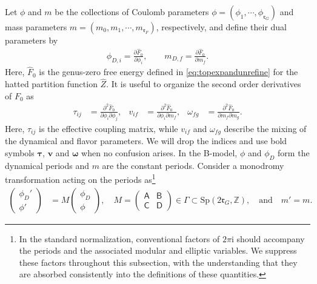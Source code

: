 \documentclass[11pt, a4paper]{article}
\theoremstyle{definition}
\begin{document}
Let $\phi$ and $m$ be the collections of Coulomb parameters $\phi=(\phi_1,\cdots,\phi_{\mathfrak{r}_G})$ and mass parameters $m=(m_0,m_1,\cdots,m_{\mathfrak{r}_F})$, respectively, and define their dual parameters by
\begin{align}
    \phi_{D,i}=\frac{\partial \hat F_0}{\partial\phi_i},
    \qquad
    m_{D,f}=\frac{\partial  \hat F_0}{\partial m_f}.
\end{align}
Here, $ \hat F_0 $ is the genus-zero free energy defined in \eqref{eq:topexpandunrefine} for the hatted partition function $\hat{Z}$. It is useful to organize the second order derivatives of $F_0$ as
\begin{align}\label{eq:tauvw}
    \tau_{ij}
    &=
    \frac{\partial^2\hat F_0}{\partial\phi_i\partial\phi_j},
    &
    v_{if}
    &=
    \frac{\partial^2\hat F_0}{\partial\phi_i\partial m_f},
    &
    \omega_{fg}
    &=
    \frac{\partial^2\hat F_0}{\partial m_f\partial m_g}.
\end{align}
Here, $\tau_{ij}$ is the effective coupling matrix, while $v_{if}$ and $\omega_{fg}$ describe the mixing of the dynamical and flavor parameters. We will drop the indices and use bold symbols $\boldsymbol{\tau}$, $\boldsymbol v$ and $\boldsymbol\omega$ when no confusion arises. In the B-model, $\phi$ and $\phi_D$ form the dynamical periods and $m$ are the constant periods. Consider a monodromy transformation acting on the periods as\footnote{In the standard normalization, conventional factors of $2\pi\mathrm{i}$ should accompany the periods and the associated modular and elliptic variables. We suppress these factors throughout this subsection, with the understanding that they are absorbed consistently into the definitions of these quantities.}
\begin{align}\label{eq:modulartransformation}
    \begin{pmatrix}
        \phi_D'\\
        \phi'
    \end{pmatrix}
    &=
    M
    \begin{pmatrix}
        \phi_D\\
        \phi
    \end{pmatrix}, \quad
    M =
    \begin{pmatrix}
        \mathsf{A} & \mathsf{B}\\
        \mathsf{C} & \mathsf{D}
    \end{pmatrix}
    \in\Gamma\subset\mathrm{Sp}(2\mathfrak{r}_G,\mathbb{Z}), \quad
    \text{and}\quad m'=m.
\end{align}
\end{document}
